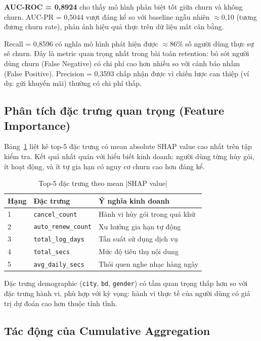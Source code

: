 \documentclass[conference]{IEEEtran}
\begin{document}
\textbf{AUC-ROC = 0,8924} cho thấy mô hình phân biệt tốt giữa churn và
không churn. AUC-PR = 0,5044 vượt đáng kể so với baseline ngẫu nhiên
$\approx$0,10 (tương đương churn rate), phản ánh hiệu quả thực trên dữ liệu
mất cân bằng.

Recall = 0,8596 có nghĩa mô hình phát hiện được $\approx$86\% số người dùng
thực sự sẽ churn. Đây là metric quan trọng nhất trong bài toán retention:
bỏ sót người dùng churn (False Negative) có chi phí cao hơn nhiều so với
cảnh báo nhầm (False Positive). Precision = 0,3593 chấp nhận được vì chiến
lược can thiệp (ví dụ: gửi khuyến mãi) thường có chi phí thấp.

\subsection{Phân tích đặc trưng quan trọng (Feature Importance)}

Bảng~\ref{tab:shap_importance} liệt kê top-5 đặc trưng có mean absolute SHAP
value cao nhất trên tập kiểm tra. Kết quả nhất quán với hiểu biết kinh
doanh: người dùng từng hủy gói, ít hoạt động, và ít tự gia hạn có nguy cơ
churn cao hơn đáng kể.

\begin{table}[htbp]
\caption{Top-5 đặc trưng theo mean |SHAP value|}
\label{tab:shap_importance}
\centering
\begin{tabular}{lll}
\toprule
\textbf{Hạng} & \textbf{Đặc trưng} & \textbf{Ý nghĩa kinh doanh} \\
\midrule
1 & \texttt{cancel\_count}       & Hành vi hủy gói trong quá khứ \\
2 & \texttt{auto\_renew\_count}  & Xu hướng gia hạn tự động \\
3 & \texttt{total\_log\_days}    & Tần suất sử dụng dịch vụ \\
4 & \texttt{total\_secs}         & Mức độ tiêu thụ nội dung \\
5 & \texttt{avg\_daily\_secs}    & Thói quen nghe nhạc hàng ngày \\
\bottomrule
\end{tabular}
\end{table}

Đặc trưng demographic (\texttt{city}, \texttt{bd}, \texttt{gender}) có tầm
quan trọng thấp hơn so với đặc trưng hành vi, phù hợp với kỳ vọng: hành vi
thực tế của người dùng có giá trị dự đoán cao hơn thuộc tính tĩnh.

\subsection{Tác động của Cumulative Aggregation}
\end{document}
